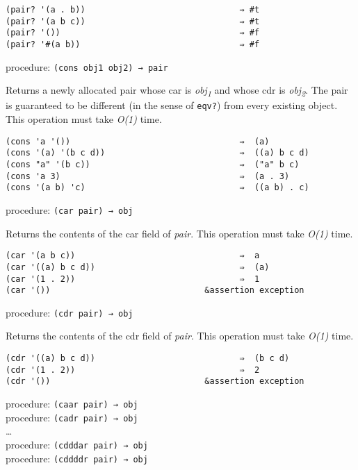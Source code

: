 \begin{verbatim}
(pair? '(a . b))                               ⇒ #t
(pair? '(a b c))                               ⇒ #t
(pair? '())                                    ⇒ #f
(pair? '#(a b))                                ⇒ #f
\end{verbatim}

procedure: \texttt{(cons\ obj1\ obj2)\ →\ pair}

Returns a newly allocated pair whose car is \emph{obj\textsubscript{1}}
and whose cdr is \emph{obj\textsubscript{2}}. The pair is guaranteed to
be different (in the sense of \texttt{eqv?}) from every existing object.
This operation must take \emph{O(1)} time.

\begin{verbatim}
(cons 'a '())                                  ⇒  (a)
(cons '(a) '(b c d))                           ⇒  ((a) b c d)
(cons "a" '(b c))                              ⇒  ("a" b c)
(cons 'a 3)                                    ⇒  (a . 3)
(cons '(a b) 'c)                               ⇒  ((a b) . c)
\end{verbatim}

procedure: \texttt{(car\ pair)\ →\ obj}

Returns the contents of the car field of \emph{pair}. This operation
must take \emph{O(1)} time.

\begin{verbatim}
(car '(a b c))                                 ⇒  a
(car '((a) b c d))                             ⇒  (a)
(car '(1 . 2))                                 ⇒  1
(car '())                               &assertion exception
\end{verbatim}

procedure: \texttt{(cdr\ pair)\ →\ obj}

Returns the contents of the cdr field of \emph{pair}. This operation
must take \emph{O(1)} time.

\begin{verbatim}
(cdr '((a) b c d))                             ⇒  (b c d)
(cdr '(1 . 2))                                 ⇒  2
(cdr '())                               &assertion exception
\end{verbatim}

procedure: \texttt{(caar\ pair)\ →\ obj}\\
procedure: \texttt{(cadr\ pair)\ →\ obj}\\
\ldots{}\\
procedure: \texttt{(cdddar\ pair)\ →\ obj}\\
procedure: \texttt{(cddddr\ pair)\ →\ obj}\\

